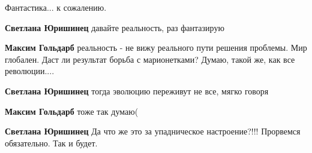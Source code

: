 \begin{itemize}
Фантастика... к сожалению.

\begin{itemize}
 
\textbf{Светлана Юришинец} давайте реальность, раз фантазирую

 
\textbf{Максим Гольдарб} реальность - не вижу реального пути решения проблемы. Мир глобален. Даст ли результат борьба с марионетками? Думаю, такой же, как все революции....

 
\textbf{Светлана Юришинец} тогда эволюцию переживут не все, мягко говоря

 
\textbf{Максим Гольдарб} тоже так думаю(

 
\textbf{Светлана Юришинец} Да что же это за упадническое настроение?!!! Прорвемся обязательно. Так и будет.

 

\end{itemize}
\end{itemize}
